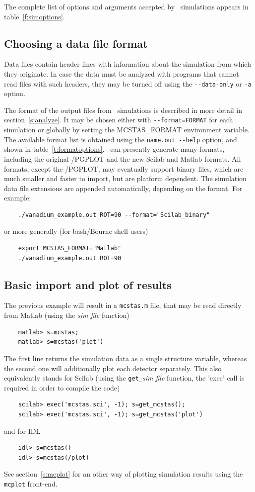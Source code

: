 The complete list of options
and arguments accepted by \MCS\ simulations appears in
table~\ref{f:simoptions}.

\subsection{Choosing a data file format}

Data files contain header lines with information about the
simulation from which they originate. In case the data must be analyzed
with programs that cannot read files with such headers, they may be
turned off using the \verb+--data-only+ or \verb+-a+ option.

The format of the output files from \MCS\ simulations is described in
more detail in section~\ref{s:analyze}. It may be chosen either with \verb+--format=FORMAT+ for each simulation or globally by setting the MCSTAS\_FORMAT environment variable. 
The available format list is obtained using the \verb+name.out --help+ option, and shown in table~\ref{t:formatoptions}.
\MCS\ can presently generate many formats, including the original \MCS /PGPLOT and the new Scilab and Matlab formats. All formats, except the \MCS /PGPLOT, may eventually support binary files, which are much smaller and faster to import, but are platform dependent. The simulation data file extensions are appended automatically, depending on the format. For example:
\begin{verbatim}
    ./vanadium_example.out ROT=90 --format="Scilab_binary"
\end{verbatim} 
or more generally (for bash/Bourne shell users)
\begin{verbatim}
    export MCSTAS_FORMAT="Matlab"
    ./vanadium_example.out ROT=90
\end{verbatim}

\subsection{Basic import and plot of results}
\label{s:run-format}
The previous example will result in a \verb+mcstas.m+ file, that may be read directly from Matlab (using the {\it sim file} function)
\begin{verbatim}
    matlab> s=mcstas;
    matlab> s=mcstas('plot')
\end{verbatim} 
The first line returns the simulation data as a single structure variable, whereas the second one will additionally plot each detector separately.
This also equivalently stands for Scilab (using the \verb+get_+{\it sim file} function, the 'exec' call is required in order to compile the code)
\begin{verbatim}
    scilab> exec('mcstas.sci', -1); s=get_mcstas();
    scilab> exec('mcstas.sci', -1); s=get_mcstas('plot')
\end{verbatim} 
and for IDL
\begin{verbatim}
    idl> s=mcstas()
    idl> s=mcstas(/plot)
\end{verbatim} 
See section~\ref{s:mcplot} for an other way of plotting simulation results using the \verb+mcplot+ front-end. 

